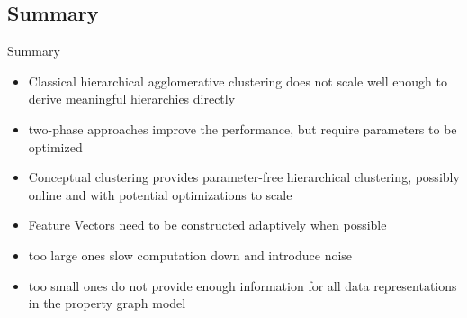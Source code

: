 \documentclass[rgb]{beamer}
\begin{document}
    \subsection{Summary}
    \begin{frame}{Summary}
       \begin{itemize}
           \item Classical hierarchical agglomerative clustering does not scale well enough to derive meaningful hierarchies directly 
           \item two-phase approaches improve the performance, but require parameters to be optimized
           \item Conceptual clustering provides parameter-free hierarchical clustering, possibly online and with potential optimizations to scale
           \item Feature Vectors need to be constructed adaptively when possible 
           \item too large ones slow computation down and introduce noise
           \item too small ones do not provide enough information for all data representations in the property graph model
       \end{itemize}
    \end{frame}{}
\end{document}
